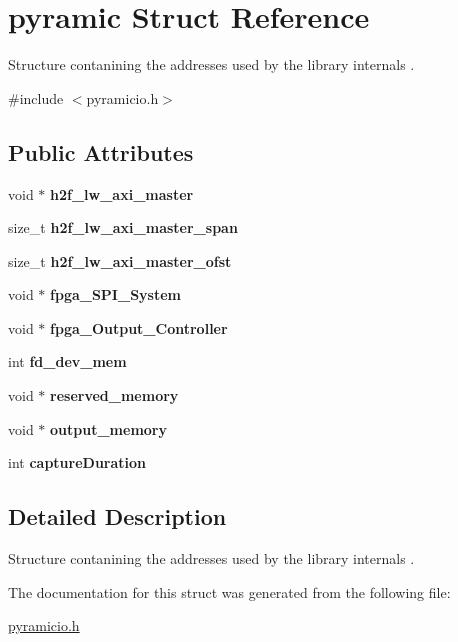 \hypertarget{structpyramic}{}\section{pyramic Struct Reference}
\label{structpyramic}


Structure contanining the addresses used by the library internals .  




{\ttfamily \#include $<$pyramicio.\+h$>$}

\subsection*{Public Attributes}
\begin{DoxyCompactItemize}
\item 
\hypertarget{structpyramic_a467fbb0b036739f9bf314822f4cee093}{}\label{structpyramic_a467fbb0b036739f9bf314822f4cee093} 
void $\ast$ {\bfseries h2f\+\_\+lw\+\_\+axi\+\_\+master}
\item 
\hypertarget{structpyramic_a50ffe7db3c7dfc0db86375465026fbba}{}\label{structpyramic_a50ffe7db3c7dfc0db86375465026fbba} 
size\+\_\+t {\bfseries h2f\+\_\+lw\+\_\+axi\+\_\+master\+\_\+span}
\item 
\hypertarget{structpyramic_af45a41e339a849f54a316baddf82d5dd}{}\label{structpyramic_af45a41e339a849f54a316baddf82d5dd} 
size\+\_\+t {\bfseries h2f\+\_\+lw\+\_\+axi\+\_\+master\+\_\+ofst}
\item 
\hypertarget{structpyramic_a7b8ded92630c4c0daecd36c48747819b}{}\label{structpyramic_a7b8ded92630c4c0daecd36c48747819b} 
void $\ast$ {\bfseries fpga\+\_\+\+S\+P\+I\+\_\+\+System}
\item 
\hypertarget{structpyramic_aea95a38021010d556ccdd17c792902de}{}\label{structpyramic_aea95a38021010d556ccdd17c792902de} 
void $\ast$ {\bfseries fpga\+\_\+\+Output\+\_\+\+Controller}
\item 
\hypertarget{structpyramic_a61d43185c9e83077a9d9c9ae1fcc3737}{}\label{structpyramic_a61d43185c9e83077a9d9c9ae1fcc3737} 
int {\bfseries fd\+\_\+dev\+\_\+mem}
\item 
\hypertarget{structpyramic_ad5e31f827fc476f41338d068786b8722}{}\label{structpyramic_ad5e31f827fc476f41338d068786b8722} 
void $\ast$ {\bfseries reserved\+\_\+memory}
\item 
\hypertarget{structpyramic_a2948d567ed66e6b398214e893a17b2af}{}\label{structpyramic_a2948d567ed66e6b398214e893a17b2af} 
void $\ast$ {\bfseries output\+\_\+memory}
\item 
\hypertarget{structpyramic_a9adbb51cf8ef7c253ff249e6621cf2f0}{}\label{structpyramic_a9adbb51cf8ef7c253ff249e6621cf2f0} 
int {\bfseries capture\+Duration}
\end{DoxyCompactItemize}


\subsection{Detailed Description}
Structure contanining the addresses used by the library internals . 



The documentation for this struct was generated from the following file\+:\begin{DoxyCompactItemize}
\item 
\hyperlink{pyramicio_8h}{pyramicio.\+h}\end{DoxyCompactItemize}
